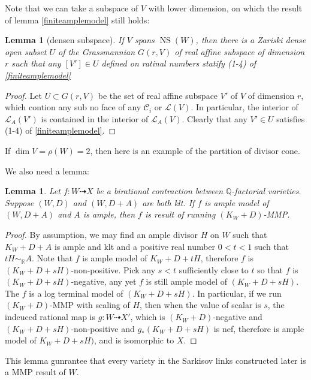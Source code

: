 \documentclass{article}
\newtheorem{lem}[defn]{Lemma}
\begin{document}
Note that we can take a subspace of $V$ with lower dimension, on which the result of lemma \ref{finiteamplemodel} still holds:

\begin{lem}[densen subspace]\label{subspace}
  If $V$ spans  $\operatorname{NS}(W)$, then there is a Zariski dense open subset $U$ of the Grassmannian $G(r,V)$ of real affine subspace of dimension $r$ such that any  $[V']\in U$ defined on ratinal numbers statify (1-4) of \ref{finiteamplemodel} 
\end{lem}
\begin{proof}
 Let $U \subset G(r,V) $ be the set of real affine subspace  $V'$ of $V$ of dimension $r$, which contion any sub no face of any $\mathcal{C}_{i}$ or $\mathcal{L}(V)$. In particular, the interior of  $\mathcal{L}_{A}(V')$ is contained in the interior of $\mathcal{L}_{A}(V)$. Clearly that any $V'\in U$ satisfies (1-4) of \ref{finiteamplemodel}.
\end{proof}

If $\dim V=\rho (W)=2  $, then here is an example of the partition of divisor cone.


We also need a lemma:
\begin{lem}
  Let $f:W\dashrightarrow X $ be a birational contraction between $\mathbb{Q}$-factorial varieties. Suppose $(W,D)$ and $(W,D+A)$ are both klt. If $f$ is ample model of $(W,D+A)$ and $A$ is ample, then $f$ is result of running $(K_{W}+D)$-MMP.
\end{lem}
\begin{proof}
By assumption, we may find an ample divisor $H$ on $W$ such that $K_{W}+D+A$ is ample and klt and a positive real number $0<t<1$ such that  $tH\sim_{\mathbb{R}}A$. Note that $f$ is ample model of $K_{W}+D+tH$, therefore $f$ is $(K_{W}+D+sH)$-non-positive.  Pick any $s<t$ sufficiently close to $t$ so that $f$ is $(K_{W}+D+sH)$-negative, any yet $f$ is still ample model of $(K_{W}+D+sH)$. The $f$ is a log terminal model of $(K_{W}+D+sH)$. In particular, if we run $( K_{W}+D)$-MMP with scaling of $H$, then when the value of scalar is $s$, the indeuced rational map is $g:W \dashrightarrow X'$, which is  $(K_{W}+D)$-negative and $(K_{W}+D+sH)$-non-positive and $g_*(K_{W}+D+sH)$ is nef, therefore is ample model of $K_{W}+D+sH)$, and is isomorphic to $X$. 
\end{proof}
This lemma gunrantee that every variety in the Sarkisov links constructed later is a MMP result of $W$.
\end{document}
